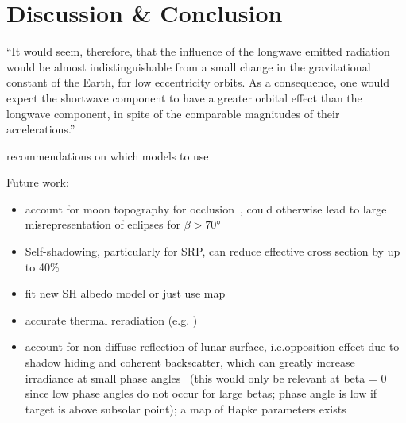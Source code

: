 \section{Discussion \& Conclusion}

\enquote{It would seem, therefore,
that the influence of the longwave emitted radiation would be almost
indistinguishable from a small change in the gravitational constant of the Earth, for
low eccentricity orbits.
As a consequence, one would expect the shortwave
component to have a greater orbital effect than the longwave component, in spite of
the comparable magnitudes of their accelerations.}~\cite{Knocke1989}


recommendations on which models to use


Future work:
\begin{itemize}
    \item account for moon topography for occlusion~\cite{Mazarico2018}, could otherwise lead to large misrepresentation of eclipses for $\beta > \ang{70}$
    \item Self-shadowing, particularly for SRP, can reduce effective cross section by up to 40\%~\cite{Mazarico2018}
    \item fit new SH albedo model or just use map
    \item accurate thermal reradiation (e.g. \cite{Marshall1994})
    \item account for non-diffuse reflection of lunar surface, i.e.opposition effect due to shadow hiding and coherent backscatter, which can greatly increase irradiance at small phase angles~\cite{Buratti1996} (this would only be relevant at beta = 0 since low phase angles do not occur for large betas; phase angle is low if target is above subsolar point); a map of Hapke parameters exists~\cite{Sato2014}
\end{itemize}


